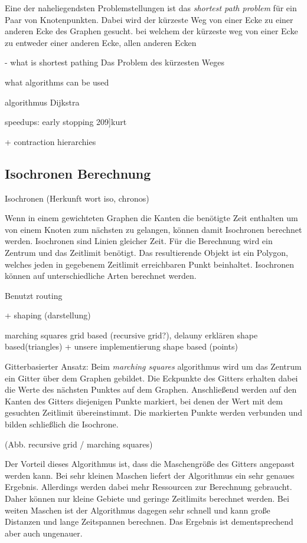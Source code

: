 \documentclass[10pt,a4paper]{article}
\begin{document}
Eine der naheliegendsten Problemstellungen ist das \textit{shortest path problem} für ein Paar von Knotenpunkten. Dabei wird der kürzeste Weg von einer Ecke zu einer anderen Ecke des Graphen gesucht. bei welchem der kürzeste weg von einer Ecke zu entweder einer anderen Ecke, allen anderen Ecken 

- what is shortest pathing
Das Problem des kürzesten Weges 
\cite[191]{kurt}


what algorithms can be used

algorithmus Dijkstra 

\cite{dijkstra}

speedups:
early stopping \cite{kurt}209]{kurt}

+ contraction hierarchies
\cite[212]{kurt}

\subsection{Isochronen Berechnung}

Isochronen (Herkunft wort iso, chronos)

Wenn in einem gewichteten Graphen die Kanten die benötigte Zeit enthalten um von einem Knoten zum nächsten zu gelangen, können damit Isochronen berechnet werden.
Isochronen sind Linien gleicher Zeit. Für die Berechnung wird ein Zentrum und das Zeitlimit benötigt. Das resultierende Objekt ist ein Polygon, welches jeden in gegebenem Zeitlimit erreichbaren Punkt beinhaltet.
Isochronen können auf unterschiedliche Arten berechnet werden. 

Benutzt routing

+ shaping (darstellung)

marching squares grid based (recursive grid?), delauny erklären shape based(triangles) + unsere implementierung shape based (points)

Gitterbasierter Ansatz:
Beim \textit{marching squares} algorithmus wird um das Zentrum ein Gitter über dem Graphen gebildet. Die Eckpunkte des Gitters erhalten dabei die Werte des nächsten Punktes auf dem Graphen. Anschließend werden auf den Kanten des Gitters diejenigen Punkte markiert, bei denen der Wert mit dem gesuchten Zeitlimit übereinstimmt. Die markierten Punkte werden verbunden und bilden schließlich die Isochrone.

(Abb. recursive grid / marching squares)

Der Vorteil dieses Algorithmus ist, dass die Maschengröße des Gitters angepasst werden kann. Bei sehr kleinen Maschen liefert der Algorithmus ein sehr genaues Ergebnis. Allerdings werden dabei mehr Ressourcen zur Berechnung gebraucht. Daher können nur kleine Gebiete und geringe Zeitlimits berechnet werden. Bei weiten Maschen ist der Algorithmus dagegen sehr schnell und kann große Distanzen und lange Zeitspannen berechnen. Das Ergebnis ist dementsprechend aber auch ungenauer.
\end{document}
